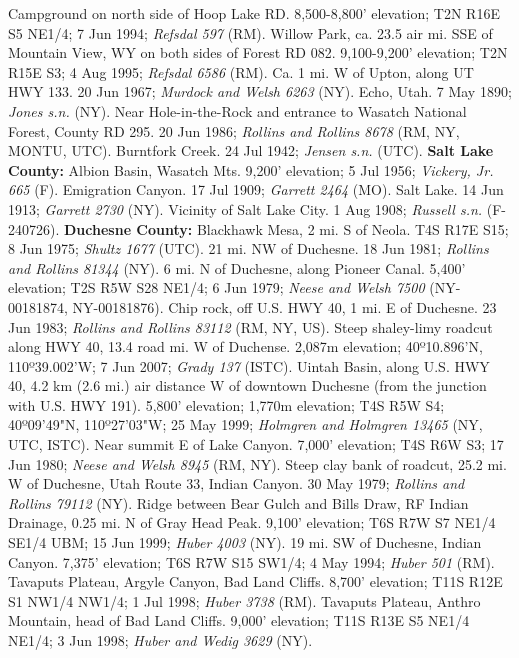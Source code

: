 Campground on north side of Hoop Lake RD. 8,500-8,800' elevation;
T2N R16E S5 NE1/4; 7 Jun 1994; \textit{Refsdal 597} (RM).
Willow Park, ca. 23.5 air mi. SSE of Mountain View, WY on both sides of
Forest RD 082. 9,100-9,200' elevation; T2N R15E S3; 4 Aug 1995;
\textit{Refsdal 6586} (RM).
Ca. 1 mi. W of Upton, along UT HWY 133. 20 Jun 1967;
\textit{Murdock and Welsh 6263} (NY).
Echo, Utah. 7 May 1890; \textit{Jones s.n.} (NY).
Near Hole-in-the-Rock and entrance to Wasatch National Forest, County RD 295.
20 Jun 1986; \textit{Rollins and Rollins 8678} (RM, NY, MONTU, UTC).
Burntfork Creek. 24 Jul 1942; \textit{Jensen s.n.} (UTC).
  \textbf{Salt Lake County:}
Albion Basin, Wasatch Mts. 9,200' elevation; 5 Jul 1956;
\textit{Vickery, Jr. 665} (F).
Emigration Canyon. 17 Jul 1909; \textit{Garrett 2464} (MO).
Salt Lake. 14 Jun 1913; \textit{Garrett 2730} (NY).
Vicinity of Salt Lake City. 1 Aug 1908; \textit{Russell s.n.} (F-240726).
  \textbf{Duchesne County:}
Blackhawk Mesa, 2 mi. S of Neola. T4S R17E S15; 8 Jun 1975;
\textit{Shultz 1677} (UTC).
21 mi. NW of Duchesne. 18 Jun 1981; \textit{Rollins and Rollins 81344} (NY).
6 mi. N of Duchesne, along Pioneer Canal. 5,400' elevation; T2S R5W S28 NE1/4;
6 Jun 1979; \textit{Neese and Welsh 7500} (NY-00181874, NY-00181876).
Chip rock, off U.S. HWY 40, 1 mi. E of Duchesne. 23 Jun 1983;
\textit{Rollins and Rollins 83112} (RM, NY, US).
Steep shaley-limy roadcut along HWY 40, 13.4 road mi. W of Duchense.
2,087m elevation; 40º10.896'N, 110º39.002'W; 7 Jun 2007;
\textit{Grady 137} (ISTC).
Uintah Basin, along U.S. HWY 40, 4.2 km (2.6 mi.) air distance W of downtown
Duchesne (from the junction with U.S. HWY 191). 5,800' elevation;
1,770m elevation; T4S R5W S4; 40º09'49"N, 110º27'03"W; 25 May 1999;
\textit{Holmgren and Holmgren 13465} (NY, UTC, ISTC).
Near summit E of Lake Canyon. 7,000' elevation; T4S R6W S3; 17 Jun 1980;
\textit{Neese and Welsh 8945} (RM, NY).
Steep clay bank of roadcut, 25.2 mi. W of Duchesne, Utah Route 33, Indian Canyon.
30 May 1979; \textit{Rollins and Rollins 79112} (NY).
Ridge between Bear Gulch and Bills Draw, RF Indian Drainage, 0.25 mi. N of
Gray Head Peak. 9,100' elevation; T6S R7W S7 NE1/4 SE1/4 UBM; 15 Jun 1999;
\textit{Huber 4003} (NY).
19 mi. SW of Duchesne, Indian Canyon. 7,375' elevation; T6S R7W S15 SW1/4;
4 May 1994; \textit{Huber 501} (RM).
Tavaputs Plateau, Argyle Canyon, Bad Land Cliffs. 8,700' elevation;
T11S R12E S1 NW1/4 NW1/4; 1 Jul 1998; \textit{Huber 3738} (RM).
Tavaputs Plateau, Anthro Mountain, head of Bad Land Cliffs. 9,000' elevation;
T11S R13E S5 NE1/4 NE1/4; 3 Jun 1998; \textit{Huber and Wedig 3629} (NY).
